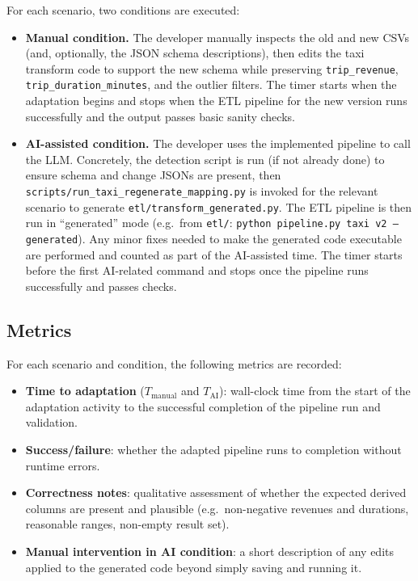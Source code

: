 For each scenario, two conditions are executed:
%
\begin{itemize}
  \item \textbf{Manual condition.} The developer manually inspects the old and
  new CSVs (and, optionally, the JSON schema descriptions), then edits the
  taxi transform code to support the new schema while preserving
  \texttt{trip\_revenue}, \texttt{trip\_duration\_minutes}, and the outlier
  filters. The timer starts when the adaptation begins and stops when the ETL
  pipeline for the new version runs successfully and the output passes basic
  sanity checks.
  \item \textbf{AI-assisted condition.} The developer uses the implemented
  pipeline to call the LLM. Concretely, the detection script is run (if not
  already done) to ensure schema and change JSONs are present, then
  \texttt{scripts/run\_taxi\_regenerate\_mapping.py} is invoked for the
  relevant scenario to generate \texttt{etl/transform\_generated.py}. The
  ETL pipeline is then run in ``generated'' mode (e.g.\ from
  \texttt{etl/}: \texttt{python pipeline.py taxi v2 --generated}). Any minor
  fixes needed to make the generated code executable are performed and counted
  as part of the AI-assisted time. The timer starts before the first
  AI-related command and stops once the pipeline runs successfully and passes
  checks.
\end{itemize}


\subsection{Metrics}

For each scenario and condition, the following metrics are recorded:
%
\begin{itemize}
  \item \textbf{Time to adaptation} (\(T_{\text{manual}}\) and
  \(T_{\text{AI}}\)): wall-clock time from the start of the adaptation
  activity to the successful completion of the pipeline run and validation.
  \item \textbf{Success/failure}: whether the adapted pipeline runs to
  completion without runtime errors.
  \item \textbf{Correctness notes}: qualitative assessment of whether the
  expected derived columns are present and plausible (e.g.\ non-negative
  revenues and durations, reasonable ranges, non-empty result set).
  \item \textbf{Manual intervention in AI condition}: a short description of
  any edits applied to the generated code beyond simply saving and running it.
\end{itemize}

